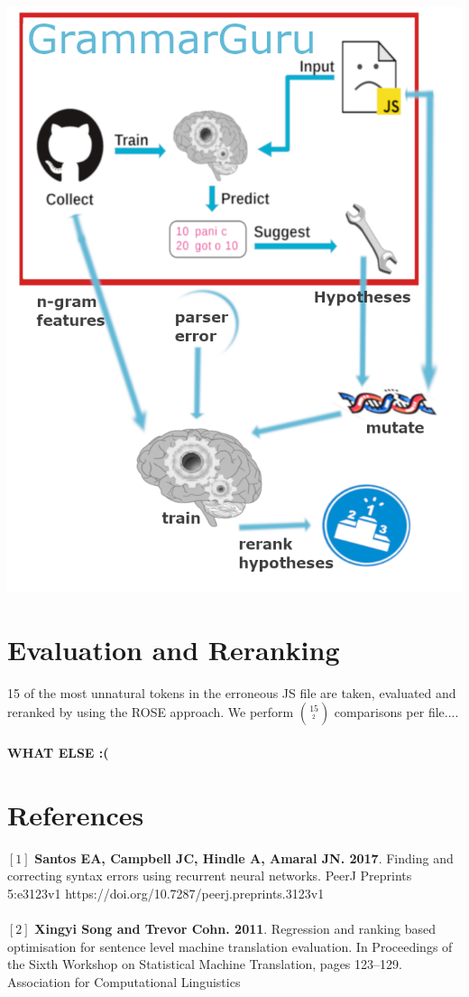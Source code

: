 \documentclass[a0,portrait]{a0poster}
\begin{document}
\begin{multicols}{2}
\color{Navy}
\begin{center}
\includegraphics[width=0.8\linewidth]{proj_img}
\end{center}
\section*{Evaluation and Reranking}
15 of the most unnatural tokens in the erroneous JS file are taken, evaluated and reranked by using the ROSE approach. We perform $15 \choose^{2}$ comparisons per file....
\\\\
\textbf{WHAT ELSE :(}

\section*{References}
\large
$[1]$ \textbf{Santos EA, Campbell JC, Hindle A, Amaral JN. 2017}. Finding and correcting syntax errors using recurrent neural networks. PeerJ Preprints 5:e3123v1 https://doi.org/10.7287/peerj.preprints.3123v1
\\
\\
$[2]$ \textbf{Xingyi Song and Trevor Cohn. 2011}. Regression and ranking based optimisation for sentence level machine translation evaluation. In Proceedings of the Sixth Workshop on Statistical Machine Translation, pages 123–129. Association for Computational Linguistics
\end{multicols}
\end{document}
